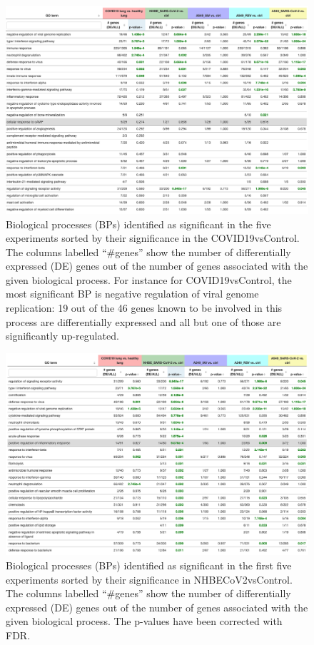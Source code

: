 \documentclass[Minh_PhD_thesis.tex]{subfiles}
\begin{document}
\begin{figure}
\centering
	 \includegraphics[width=1\linewidth]{../Figures/BPs_elim_FDR_all.png}
    \caption{Biological processes (BPs) identified as significant in the five experiments sorted by their significance in the COVID19vsControl. The  columns labelled ``\#genes'' show the number of differentially expressed (DE) genes out of the number of genes associated with the given biological process.  For instance for COVID19vsControl, the most significant BP is negative regulation of viral genome replication: 19 out of the 46 genes known to be involved in this process are differentially expressed and all but one of those are significantly up-regulated.  \label{Supp:BPs}}
        
\end{figure}

\begin{figure}
\centering
	\includegraphics[width=1\linewidth]{../Figures/BPs_elim_FDR_all_orderedby_NHBE.png}
    \caption{Biological processes (BPs) identified as significant in the first five experiments sorted by their significance in NHBECoV2vsControl. The  columns labelled ``\#genes'' show the number of differentially expressed (DE) genes out of the number of genes associated with the given biological process. The p-values have been corrected with FDR. }
        \label{Supp:BP_orderedby_NHBE} 
\end{figure}
\end{document}
